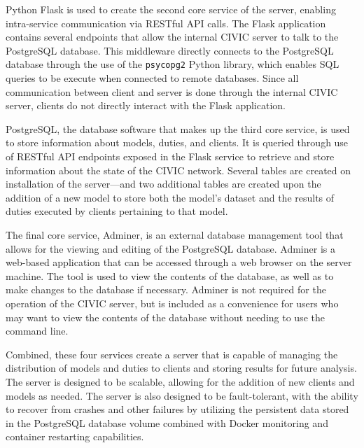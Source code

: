 \documentclass[11pt]{article}
\begin{document}
Python Flask is used to create the second core service of the server, enabling intra-service communication via RESTful API calls. The Flask application contains several endpoints that allow the internal CIVIC server to talk to the PostgreSQL database. This middleware directly connects to the PostgreSQL database through the use of the \verb|psycopg2| Python library, which enables SQL queries to be execute when connected to remote databases. Since all communication between client and server is done through the internal CIVIC server, clients do not directly interact with the Flask application. 

PostgreSQL, the database software that makes up the third core service, is used to store information about models, duties, and clients. It is queried through use of RESTful API endpoints exposed in the Flask service to retrieve and store information about the state of the CIVIC network. Several tables are created on installation of the server---and two additional tables are created upon the addition of a new model to store both the model's dataset and the results of duties executed by clients pertaining to that model. 

The final core service, Adminer, is an external database management tool that allows for the viewing and editing of the PostgreSQL database. Adminer is a web-based application that can be accessed through a web browser on the server machine. The tool is used to view the contents of the database, as well as to make changes to the database if necessary. Adminer is not required for the operation of the CIVIC server, but is included as a convenience for users who may want to view the contents of the database without needing to use the command line.

Combined, these four services create a server that is capable of managing the distribution of models and duties to clients and storing results for future analysis. The server is designed to be scalable, allowing for the addition of new clients and models as needed. The server is also designed to be fault-tolerant, with the ability to recover from crashes and other failures by utilizing the persistent data stored in the PostgreSQL database volume combined with Docker monitoring and container restarting capabilities.
\end{document}
